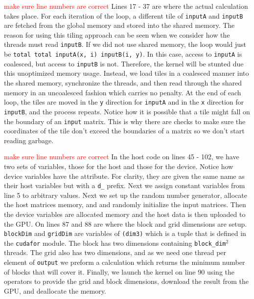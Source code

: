\documentclass[12pt]{report}
\newcommand{\notetodylan}[1]{\textcolor{red}{#1}} %
\begin{document}
\notetodylan{make sure line numbers are correct} Lines 17 - 37 are where the actual calculation takes place. For each iteration of the loop, a different tile of \texttt{inputA} and \texttt{inputB} are fetched from the global memory and stored into the shared memory. The reason for using this tiling approach can be seen when we consider how the threads must read \texttt{inputB}. If we did not use shared memory, the loop would just be \texttt{total {\color{myyellow}{=}} total {\color{myyellow}{+}} inputA(x, i) {\color{myyellow}{*}} inputB(i, y)}. In this case, access to \texttt{inputA} is coalesced, but access to \texttt{inputB} is not. Therefore, the kernel will be stunted due this unoptimized memory usage. Instead, we load tiles in a coalesced manner into the shared memory, synchronize the threads, and then read through the shared memory in an uncoalesced fashion which carries no penalty. At the end of each loop, the tiles are moved in the \texttt{y} direction for \texttt{inputA} and in the \texttt{x} direction for \texttt{inputB}, and the process repeats. Notice how it is possible that a tile might fall on the boundary of an \texttt{input} matrix. This is why there are checks to make sure the coordinates of the tile don't exceed the boundaries of a matrix so we don't start reading garbage.

\notetodylan{make sure line numbers are correct} In the host code on lines 45 - 102, we have two sets of variables, those for the host and those for the device. Notice how device variables have the \texttt{{\color{mygreen}{device}}} attribute. For clarity, they are given the same name as their host variables but with a \texttt{d\_} prefix. Next we assign constant variables from line 5 to arbitrary values. Next we set up the random number generator, allocate the host matrices memory, and and randomly initialize the input matrices. Then the device variables are allocated memory and the host data is then uploaded to the GPU. On lines 87 and 88 are where the block and grid dimensions are setup. \texttt{blockDim} and \texttt{gridDim} are variables of \texttt{{\color{mygreen}{type}}(dim3)} which is a tuple that is defined in the \texttt{cudafor} module. The block has two dimensions containing \texttt{block\_dim}$^{2}$ threads. The grid also has two dimensions, and as we need one thread per element of \texttt{output} we preform a calculation which returns the minimum number of blocks that will cover it. Finally, we launch the kernel on line 90 using the \texttt{\color{myyellow}{<<< >>>}} operators to provide the grid and block dimensions, download the result from the GPU, and deallocate the memory.
\end{document}

